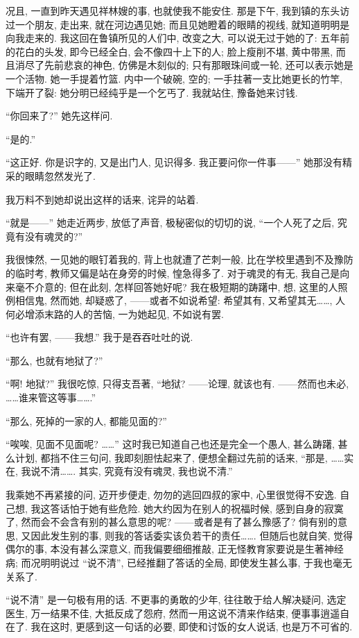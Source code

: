 况且, 一直到昨天遇见祥林嫂的事, 也就使我不能安住.
那是下午, 我到镇的东头访过一个朋友, 走出来, 就在河边遇见她;
而且见她瞪着的眼睛的视线, 就知道明明是向我走来的.
我这回在鲁镇所见的人们中, 改变之大, 可以说无过于她的了:
五年前的花白的头发, 即今已经全白, 会不像四十上下的人;
脸上瘦削不堪, 黄中带黑, 而且消尽了先前悲哀的神色, 仿佛是木刻似的;
只有那眼珠间或一轮, 还可以表示她是一个活物.
她一手提着竹篮.
内中一个破碗, 空的;
一手拄著一支比她更长的竹竿, 下端开了裂:
她分明已经纯乎是一个乞丐了.
我就站住, 豫备她来讨钱.

``你回来了?''
她先这样问.

``是的.''

``这正好.
你是识字的, 又是出门人, 见识得多.
我正要问你一件事——''
她那没有精采的眼睛忽然发光了.

我万料不到她却说出这样的话来, 诧异的站着.

``就是——''
她走近两步, 放低了声音, 极秘密似的切切的说,
``一个人死了之后, 究竟有没有魂灵的?''

我很悚然, 一见她的眼钉着我的, 背上也就遭了芒刺一般,
比在学校里遇到不及豫防的临时考, 教师又偏是站在身旁的时候,
惶急得多了.
对于魂灵的有无, 我自己是向来毫不介意的;
但在此刻, 怎样回答她好呢? 我在极短期的踌躇中, 想,
这里的人照例相信鬼, 然而她, 却疑惑了, ——或者不如说希望:
希望其有, 又希望其无……,
人何必增添末路的人的苦恼, 一为她起见, 不如说有罢.

``也许有罢, ——我想.''
我于是吞吞吐吐的说.

``那么, 也就有地狱了?''

``啊! 地狱?''
我很吃惊, 只得支吾著,
``地狱? ——论理, 就该也有.
——然而也未必, ……谁来管这等事…….''

``那么, 死掉的一家的人, 都能见面的?''

``唉唉, 见面不见面呢? ……''
这时我已知道自己也还是完全一个愚人, 甚么踌躇, 甚么计划,
都挡不住三句问, 我即刻胆怯起来了, 便想全翻过先前的话来,
``那是, ……实在, 我说不清…….
其实, 究竟有没有魂灵, 我也说不清.''

我乘她不再紧接的问, 迈开步便走,
勿勿的逃回四叔的家中, 心里很觉得不安逸.
自己想, 我这答话怕于她有些危险.
她大约因为在别人的祝福时候, 感到自身的寂寞了,
然而会不会含有别的甚么意思的呢? ——或者是有了甚么豫感了?
倘有别的意思, 又因此发生别的事, 则我的答话委实该负若干的责任…….
但随后也就自笑, 觉得偶尔的事, 本没有甚么深意义,
而我偏要细细推敲, 正无怪教育家要说是生著神经病;
而况明明说过 ``说不清'', 已经推翻了答话的全局,
即使发生甚么事, 于我也毫无关系了.

``说不清'' 是一句极有用的话.
不更事的勇敢的少年, 往往敢于给人解决疑问, 选定医生, 万一结果不佳, 大抵反成了怨府, 然而一用这说不清来作结束, 便事事逍遥自在了.
我在这时, 更感到这一句话的必要,
即使和讨饭的女人说话, 也是万不可省的.

